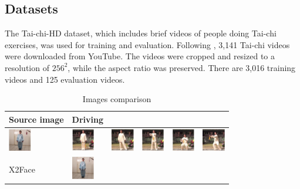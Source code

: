\documentclass{article}
\begin{document}
\subsection{Datasets}
The Tai-chi-HD dataset, which includes brief videos of people doing Tai-chi
exercises, was used for training and evaluation. Following
\cite{siarohin2020order}, 3,141 Tai-chi videos were downloaded from YouTube.
The videos were cropped and resized to a resolution of $256^2$, while the
aspect ratio was preserved. There are 3,016 training videos and 125
evaluation videos.

\begin{table}[t]
\caption{Images comparison}
\label{table:images}
\vskip 0.15in
\begin{center}
\begin{small}
\begin{sc}
\begin{tabular}{m{1.0cm}m{1.0cm}m{1.0cm}m{1.0cm}m{1.0cm}m{1.0cm}}
\toprule
Source image & Driving\\
\toprule
\includegraphics[width=1cm, height=1cm]{images/source} &
\includegraphics[width=1cm, height=1cm]{images/driving_1} &
\includegraphics[width=1cm, height=1cm]{images/driving_2} &
\includegraphics[width=1cm, height=1cm]{images/driving_3} &
\includegraphics[width=1cm, height=1cm]{images/driving_4} &
\includegraphics[width=1cm, height=1cm]{images/driving_5} \\
\midrule
X2Face & \includegraphics[width=1cm, height=1cm]{images/1_X2Face_1} &

\end{tabular}
\end{sc}
\end{small}
\end{center}
\end{table}
\end{document}
